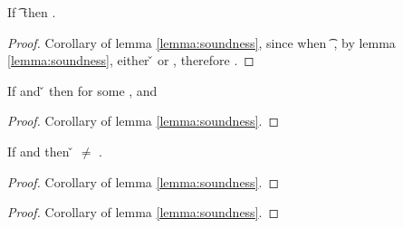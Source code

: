 \begin{theorem} \label{theorem:wrong}
  If {\judgement {} {\hastype {\e{}} {\t{}}} {\filterset {\thenprop{\prop{}}}{\elseprop{\prop{}}}} {\object{}}}
  then \notopsem{}{\e{}}{\wrong{}}.

\begin{proof}
  Corollary of lemma \ref{lemma:soundness}, since 
  when {\judgement {} {\hastype {\e{}} {\t{}}} {\filterset {\thenprop{\prop{}}}{\elseprop{\prop{}}}} {\object{}}}
    , by lemma \ref{lemma:soundness}, either
    \opsem {} {\e{}} {\v{}} or
    \opsem {} {\e{}} {\errorvalv{}}, therefore \notopsem{}{\e{}}{\wrong{}}.
\end{proof}
\end{theorem}

\begin{theorem} \label{theorem:soundness}
If \judgement{\propenv{}}{\hastype{\e{}}{\t{}}}{\filterset{\thenprop{\prop{}}}{\elseprop{\prop{}}}}{\object{}}
and \opsem {\openv{}} {\e{}} {\v{}} 
then \judgement{}{\hastype{\v{}}{\t{}}}{\filterset{\thenprop{\propp{}}}{\elseprop{\propp{}}}}{\objectp{}}
        for some \thenprop{\propp{}}, \elseprop{\propp{}} and {\objectp{}}

\begin{proof}
  Corollary of lemma \ref{lemma:soundness}.
\end{proof}

\end{theorem}

\begin{theorem} \label{theorem:nullpointer}
If \judgement{\propenv{}}{\hastype{\v{}}{\t{}}}{\filterset{\thenprop{\prop{}}}{\elseprop{\prop{}}}}{\object{}}
and \notsubtypein{}{\Nil{}}{\t{}}
then {\v{}} $\not=$ \nil{}.
\begin{proof}
  Corollary of lemma \ref{lemma:soundness}.
\end{proof}

\end{theorem}

\begin{lemma} \label{lemma:fieldgood}

\begin{proof}
  Corollary of lemma \ref{lemma:soundness}.
\end{proof}

\end{lemma}

